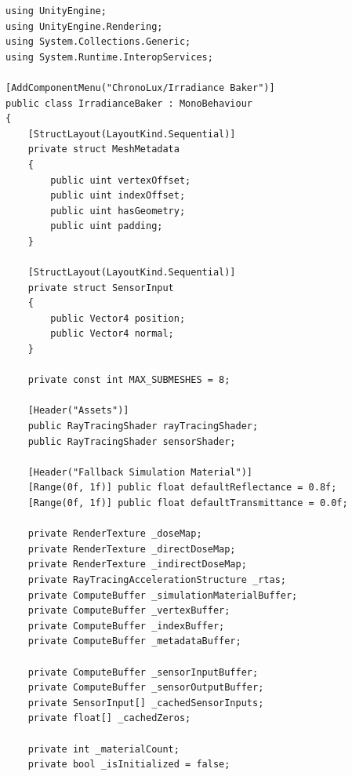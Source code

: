 \begin{lstlisting}[language={[Sharp]C}, caption={IrradianceBaker.cs: Orchestrates the hardware-accelerated DXR raytracing passes.}, label={lst:irradiancebaker}]
using UnityEngine;
using UnityEngine.Rendering;
using System.Collections.Generic;
using System.Runtime.InteropServices;

[AddComponentMenu("ChronoLux/Irradiance Baker")]
public class IrradianceBaker : MonoBehaviour
{
    [StructLayout(LayoutKind.Sequential)]
    private struct MeshMetadata
    {
        public uint vertexOffset;
        public uint indexOffset;
        public uint hasGeometry; 
        public uint padding;     
    }

    [StructLayout(LayoutKind.Sequential)]
    private struct SensorInput
    {
        public Vector4 position; 
        public Vector4 normal;   
    }

    private const int MAX_SUBMESHES = 8;

    [Header("Assets")]
    public RayTracingShader rayTracingShader;
    public RayTracingShader sensorShader;

    [Header("Fallback Simulation Material")]
    [Range(0f, 1f)] public float defaultReflectance = 0.8f;
    [Range(0f, 1f)] public float defaultTransmittance = 0.0f;

    private RenderTexture _doseMap;
    private RenderTexture _directDoseMap;
    private RenderTexture _indirectDoseMap;
    private RayTracingAccelerationStructure _rtas;
    private ComputeBuffer _simulationMaterialBuffer;
    private ComputeBuffer _vertexBuffer;
    private ComputeBuffer _indexBuffer;
    private ComputeBuffer _metadataBuffer;

    private ComputeBuffer _sensorInputBuffer;
    private ComputeBuffer _sensorOutputBuffer;
    private SensorInput[] _cachedSensorInputs;
    private float[] _cachedZeros;

    private int _materialCount;
    private bool _isInitialized = false;


\end{lstlisting}
